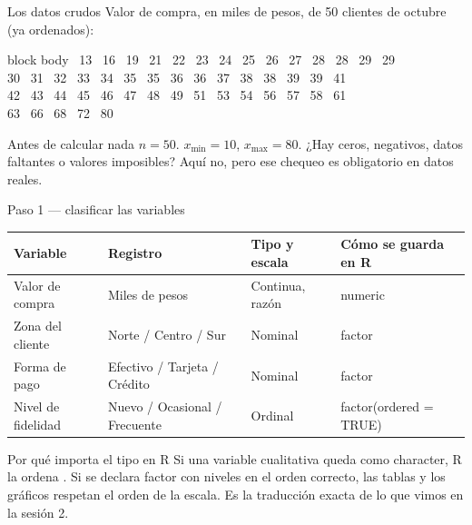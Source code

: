 \documentclass[aspectratio=169,10pt]{beamer}
\newcommand{\fx}[1]{{\ttfamily\color{uniAzul}#1}}
\begin{document}
\begin{frame}{Los datos crudos}
  \footnotesize
  Valor de compra, en miles de pesos, de 50 clientes de octubre (ya ordenados):

  \vspace{0.15cm}
  \begin{beamercolorbox}[wd=\textwidth,sep=0.12cm]{block body}
    \centering\scriptsize{} \ 13 \ 16 \ 19 \ 21 \ 22 \ 23 \ 24 \ 25 \ 26 \ 27 \ 28 \ 28 \ 29 \ 29 \\
    30 \ 31 \ 32 \ 33 \ 34 \ 35 \ 35 \ 36 \ 36 \ 37 \ 38 \ 38 \ 39 \ 39 \ 41 \\
    42 \ 43 \ 44 \ 45 \ 46 \ 47 \ 48 \ 49 \ 51 \ 53 \ 54 \ 56 \ 57 \ 58 \ 61 \\
    63 \ 66 \ 68 \ 72 \ 80
  \end{beamercolorbox}

  \vspace{0.15cm}
  \begin{alertblock}{Antes de calcular nada}
    \scriptsize
     $n = 50$. \quad {}
    $x_{\min}=10$, $x_{\max}=80$. \quad {} ¿Hay ceros,
    negativos, datos faltantes o valores imposibles? Aquí no, pero ese chequeo
    es obligatorio en datos reales.
  \end{alertblock}
\end{frame}

\begin{frame}{Paso 1 — clasificar las variables}
  \scriptsize
  \begin{center}
  \begin{tabular}{@{}p{2.6cm}p{3.0cm}p{2.5cm}p{3.4cm}@{}}
    \toprule
    \textbf{Variable} & \textbf{Registro} & \textbf{Tipo y escala} &
    \textbf{Cómo se guarda en R} \\
    \midrule
    Valor de compra & Miles de pesos & Continua, razón &
      \fx{numeric} \\
    \addlinespace
    Zona del cliente & Norte / Centro / Sur & Nominal &
      \fx{factor} \\
    \addlinespace
    Forma de pago & Efectivo / Tarjeta / Crédito & Nominal &
      \fx{factor} \\
    \addlinespace
    Nivel de fidelidad & Nuevo / Ocasional / Frecuente & Ordinal &
      \fx{factor(ordered = TRUE)} \\
    \bottomrule
  \end{tabular}
  \end{center}

  \vspace{0.1cm}
  \begin{alertblock}{Por qué importa el tipo en R}
    \scriptsize
    Si una variable cualitativa queda como \fx{character}, R la ordena
    . Si se declara \fx{factor} con niveles en el orden
    correcto, las tablas y los gráficos respetan el orden de la escala. Es la
    traducción exacta de lo que vimos en la sesión 2.
  \end{alertblock}
\end{frame}
\end{document}
